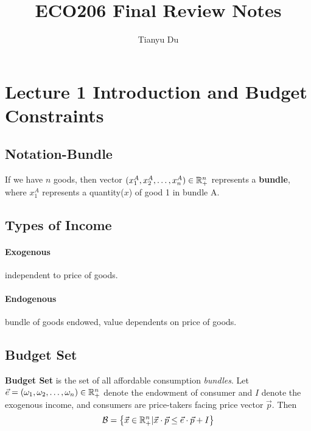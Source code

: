 \documentclass[]{article}
\title{ECO206 Final Review Notes}
\author{Tianyu Du}
\begin{document}
    \maketitle
    \tableofcontents

    \section{Lecture 1 Introduction and Budget Constraints}
    
        \subsection{Notation-Bundle}
            \begin{definition}
                If we have $n$ goods, then vector $(x_1^A, x_2^A, \dots, x_n^A) \in \mathbb{R}^n_+$ represents a \textbf{bundle}, where $x_1^A$ represents a quantity($x$) of good 1 in bundle A. 
            \end{definition}
            
        \subsection{Types of Income}
            \paragraph{Exogenous}independent to price of goods.
            \paragraph{Endogenous}bundle of goods endowed, value dependents on price of goods.
            
        \subsection{Budget Set}
            \begin{definition}
                \textbf{Budget Set} is the set of all affordable consumption \emph{bundles}. Let $\vec{e}=(\omega_1,\omega_2,\dots,\omega_n) \in \mathbb{R}^n_+$ denote the endowment of consumer and $I$ denote the exogenous income, and consumers are price-takers facing price vector $\vec{p}$. Then
                \[
                    \mathcal{B} = \big\{\vec{x}\in \mathbb{R}^n_+ \vert \vec{x}\cdot\vec{p} \leq \vec{e}\cdot\vec{p} + I  \big\}
                \]
            \end{definition}
            
\end{document}
